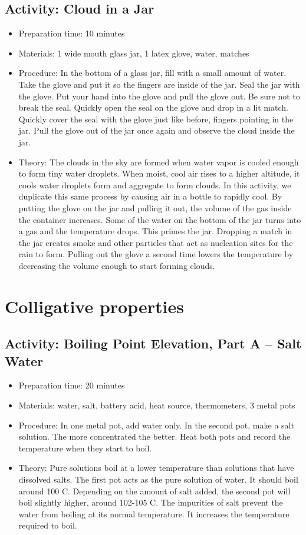 \begin{itemize}
{\subsection{Activity: Cloud in a Jar}
\begin{itemize}
\item{Preparation time: 10 minutes}
\item{Materials: 1 wide mouth glass jar, 1 latex glove, water, matches}
\item{Procedure: In the bottom of a glass jar, fill with a small amount of water. Take the glove and put it so the fingers are inside of the jar. Seal the jar with the glove. Put your hand into the glove and pull the glove out. Be sure not to break the seal. Quickly open the seal on the glove and drop in a lit match. Quickly cover the seal with the glove just like before, fingers pointing in the jar. Pull the glove out of the jar once again and observe the cloud inside the jar.}
\item{Theory: The clouds in the sky are formed when water vapor is cooled enough to form tiny water droplets. When moist, cool air rises to a higher altitude, it cools water droplets form and aggregate to form clouds. In this activity, we duplicate this same process by causing air in a bottle to rapidly cool. By putting the glove on the jar and pulling it out, the volume of the gas inside the container increases. Some of the water on the bottom of the jar turns into a gas and the temperature drops. This primes the jar. Dropping a match in the jar creates smoke and other particles that act as nucleation sites for the rain to form. Pulling out the glove a second time lowers the temperature by decreasing the volume enough to start forming clouds.}
\end{itemize}

\section{Colligative properties}

\subsection{Activity: Boiling Point Elevation, Part A – Salt Water}
\begin{itemize}
\item{Preparation time: 20 minutes}
\item{Materials: water, salt, battery acid, heat source, thermometers, 3 metal pots}
\item{Procedure: In one metal pot, add water only. In the second pot, make a salt solution. The more concentrated the better. Heat both pots and record the temperature when they start to boil. }
\item{Theory: Pure solutions boil at a lower temperature than solutions that have dissolved salts. The first pot acts as the pure solution of water. It should boil around 100 C. Depending on the amount of salt added, the second pot will boil slightly higher, around 102-105 C. The impurities of salt prevent the water from boiling at its normal temperature. It increases the temperature required to boil. }
\end{itemize}

}
\end{itemize}
